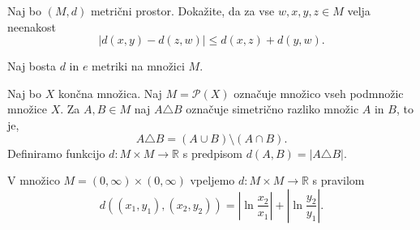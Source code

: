 \documentclass[11pt,a4paper]{exam}
\renewcommand{\leq}{\leqslant} %
\renewcommand{\subset}{\subseteq}
\renewcommand{\{}{\lbrace}
\renewcommand{\}}{\rbrace}
\begin{document}
\begin{questions}

	\question Naj bo $(M,d)$ metrični prostor. Dokažite, da za vse $w, x, y, z \in M$ velja neenakost 
		\[
		|d(x,y) - d(z,w)| \leq d(x,z) + d(y,w).
		\]

	\question Naj bosta $d$ in $e$ metriki na množici $M$. 

		\question Naj bo $X$ končna množica. Naj $M=\mathcal{P}(X)$ označuje množico vseh podmnožic množice $X$. Za $A,B \in M$ naj $A \triangle B$ označuje simetrično razliko množic $A$ in $B$, to je, \[A \triangle B = (A\cup B) \setminus (A \cap B).  \] Definiramo funkcijo $d: M \times M \to \mathbb{R}$ s predpisom $d(A,B) = \left| A \triangle B \right|$.

		
		

	\question	V množico $M=(0,\infty) \times (0, \infty)$ vpeljemo $d: M \times M \to \mathbb{R}$ s pravilom \[d\left( (x_{1},y_{1}), (x_{2},y_{2}) \right) = \left| \ln \frac{x_{2}}{x_{1}} \right| + \left| \ln \frac{y_{2}}{y_{1}} \right|.\]


\end{questions}
\end{document}
